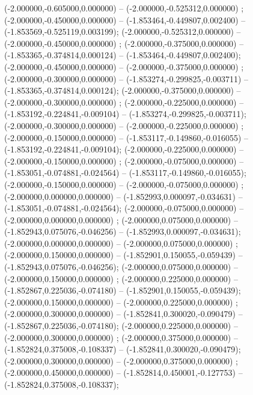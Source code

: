  (-2.000000,-0.605000,0.000000) -- (-2.000000,-0.525312,0.000000) ;
 (-2.000000,-0.450000,0.000000) -- (-1.853464,-0.449807,0.002400) -- (-1.853569,-0.525119,0.003199);
 (-2.000000,-0.525312,0.000000) -- (-2.000000,-0.450000,0.000000) ;
 (-2.000000,-0.375000,0.000000) -- (-1.853365,-0.374814,0.000124) -- (-1.853464,-0.449807,0.002400);
 (-2.000000,-0.450000,0.000000) -- (-2.000000,-0.375000,0.000000) ;
 (-2.000000,-0.300000,0.000000) -- (-1.853274,-0.299825,-0.003711) -- (-1.853365,-0.374814,0.000124);
 (-2.000000,-0.375000,0.000000) -- (-2.000000,-0.300000,0.000000) ;
 (-2.000000,-0.225000,0.000000) -- (-1.853192,-0.224841,-0.009104) -- (-1.853274,-0.299825,-0.003711);
 (-2.000000,-0.300000,0.000000) -- (-2.000000,-0.225000,0.000000) ;
 (-2.000000,-0.150000,0.000000) -- (-1.853117,-0.149860,-0.016055) -- (-1.853192,-0.224841,-0.009104);
 (-2.000000,-0.225000,0.000000) -- (-2.000000,-0.150000,0.000000) ;
 (-2.000000,-0.075000,0.000000) -- (-1.853051,-0.074881,-0.024564) -- (-1.853117,-0.149860,-0.016055);
 (-2.000000,-0.150000,0.000000) -- (-2.000000,-0.075000,0.000000) ;
 (-2.000000,0.000000,0.000000) -- (-1.852993,0.000097,-0.034631) -- (-1.853051,-0.074881,-0.024564);
 (-2.000000,-0.075000,0.000000) -- (-2.000000,0.000000,0.000000) ;
 (-2.000000,0.075000,0.000000) -- (-1.852943,0.075076,-0.046256) -- (-1.852993,0.000097,-0.034631);
 (-2.000000,0.000000,0.000000) -- (-2.000000,0.075000,0.000000) ;
 (-2.000000,0.150000,0.000000) -- (-1.852901,0.150055,-0.059439) -- (-1.852943,0.075076,-0.046256);
 (-2.000000,0.075000,0.000000) -- (-2.000000,0.150000,0.000000) ;
 (-2.000000,0.225000,0.000000) -- (-1.852867,0.225036,-0.074180) -- (-1.852901,0.150055,-0.059439);
 (-2.000000,0.150000,0.000000) -- (-2.000000,0.225000,0.000000) ;
 (-2.000000,0.300000,0.000000) -- (-1.852841,0.300020,-0.090479) -- (-1.852867,0.225036,-0.074180);
 (-2.000000,0.225000,0.000000) -- (-2.000000,0.300000,0.000000) ;
 (-2.000000,0.375000,0.000000) -- (-1.852824,0.375008,-0.108337) -- (-1.852841,0.300020,-0.090479);
 (-2.000000,0.300000,0.000000) -- (-2.000000,0.375000,0.000000) ;
 (-2.000000,0.450000,0.000000) -- (-1.852814,0.450001,-0.127753) -- (-1.852824,0.375008,-0.108337);
